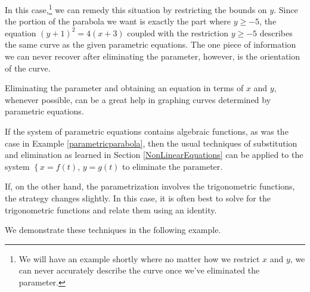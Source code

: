 \smallskip

In this case,\footnote{We will have an example shortly where no matter how we restrict $x$ and $y$, we can never accurately describe the curve once we've eliminated the parameter.} we can remedy this situation by restricting the bounds on $y$.  Since the portion of the parabola we want is exactly the part where $y \geq -5$, the equation $(y+1)^2 = 4(x+3)$ coupled with the restriction $y \geq -5$ describes the same curve as the given parametric equations.  The one piece of information we can never recover after eliminating the parameter, however,  is the orientation of the curve.

\smallskip

Eliminating the parameter and obtaining an equation in terms of $x$ and $y$, whenever possible, can be a great help in graphing curves determined by parametric equations.

\smallskip

 If the system of parametric equations contains algebraic functions, as was the case in  Example \ref{parametricparabola}, then the usual techniques of substitution and elimination as learned  in Section \ref{NonLinearEquations} can be applied to the system $\left\{ x = f(t), \, y = g(t) \right.$ to eliminate the parameter.  
 
 \smallskip
 
 If, on the other hand, the parametrization involves the trigonometric functions, the strategy changes slightly.  In this case, it is often best to solve for the trigonometric functions and relate them using an identity.  
 
 \smallskip
 
 We demonstrate these techniques in the following example.

